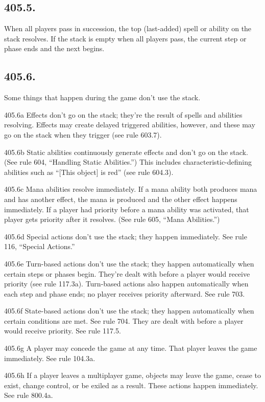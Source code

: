 \subsection*{405.5.}
When all players pass in succession, the top (last-added) spell or ability on the stack resolves. If the stack is empty when all players pass, the current step or phase ends and the next begins.

\subsection*{405.6.}
Some things that happen during the game don’t use the stack.

405.6a Effects don’t go on the stack; they’re the result of spells and abilities resolving. Effects may create delayed triggered abilities, however, and these may go on the stack when they trigger (see rule 603.7).

405.6b Static abilities continuously generate effects and don’t go on the stack. (See rule 604, “Handling Static Abilities.”) This includes characteristic-defining abilities such as “[This object] is red” (see rule 604.3).

405.6c Mana abilities resolve immediately. If a mana ability both produces mana and has another effect, the mana is produced and the other effect happens immediately. If a player had priority before a mana ability was activated, that player gets priority after it resolves. (See rule 605, “Mana Abilities.”)

405.6d Special actions don’t use the stack; they happen immediately. See rule 116, “Special Actions.”

405.6e Turn-based actions don’t use the stack; they happen automatically when certain steps or phases begin. They’re dealt with before a player would receive priority (see rule 117.3a). Turn-based actions also happen automatically when each step and phase ends; no player receives priority afterward. See rule 703.

405.6f State-based actions don’t use the stack; they happen automatically when certain conditions are met. See rule 704. They are dealt with before a player would receive priority. See rule 117.5.

405.6g A player may concede the game at any time. That player leaves the game immediately. See rule 104.3a.

405.6h If a player leaves a multiplayer game, objects may leave the game, cease to exist, change control, or be exiled as a result. These actions happen immediately. See rule 800.4a.

